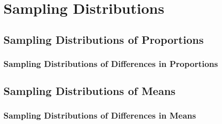 \documentclass[../AP_Statistics.tex]{subfiles}
\begin{document}
	\chapter{Sampling Distributions}
		\section{Sampling Distributions of Proportions}
			\subsection*{Sampling Distributions of Differences in Proportions}
		\section{Sampling Distributions of Means}
			\subsection*{Sampling Distributions of Differences in Means}
\end{document}
